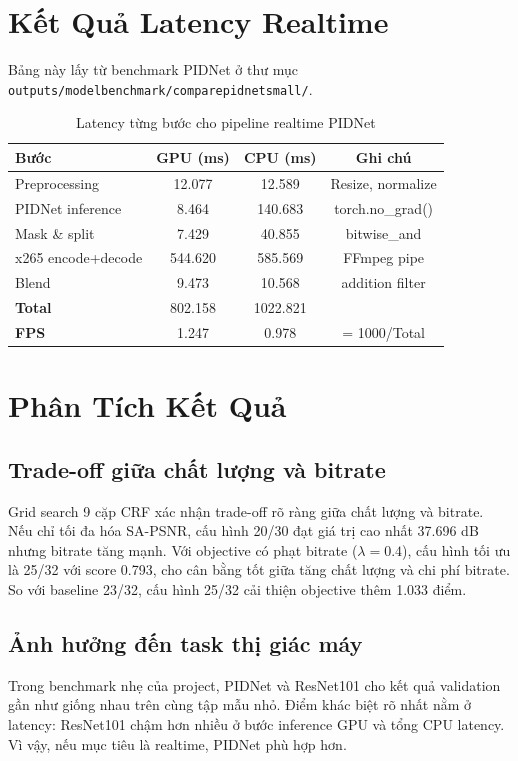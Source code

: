 \documentclass[12pt,a4paper]{article}
\begin{document}
\section{Kết Quả Latency Realtime}
Bảng này lấy từ benchmark PIDNet ở thư mục \texttt{outputs/model\textunderscore benchmark/compare\textunderscore pidnet\textunderscore small/}.

\begin{table}[H]
\centering
\caption{Latency từng bước cho pipeline realtime PIDNet}
\label{tab:latency}
\begin{tabular}{lccc}
\toprule
\textbf{Bước} & \textbf{GPU (ms)} & \textbf{CPU (ms)} & \textbf{Ghi chú} \\
\midrule
Preprocessing & 12.077 & 12.589 & Resize, normalize \\
PIDNet inference & 8.464 & 140.683 & torch.no\_grad() \\
Mask \& split & 7.429 & 40.855 & bitwise\_and \\
x265 encode+decode & 544.620 & 585.569 & FFmpeg pipe \\
Blend & 9.473 & 10.568 & addition filter \\
\midrule
\textbf{Total} & 802.158 & 1022.821 &  \\
\textbf{FPS} & 1.247 & 0.978 & = 1000/Total \\
\bottomrule
\end{tabular}
\end{table}

\section{Phân Tích Kết Quả}
\subsection{Trade-off giữa chất lượng và bitrate}
Grid search 9 cặp CRF xác nhận trade-off rõ ràng giữa chất lượng và bitrate. Nếu chỉ tối đa hóa SA-PSNR, cấu hình 20/30 đạt giá trị cao nhất 37.696 dB nhưng bitrate tăng mạnh. Với objective có phạt bitrate ($\lambda=0.4$), cấu hình tối ưu là 25/32 với score 0.793, cho cân bằng tốt giữa tăng chất lượng và chi phí bitrate. So với baseline 23/32, cấu hình 25/32 cải thiện objective thêm 1.033 điểm.

\subsection{Ảnh hưởng đến task thị giác máy}
Trong benchmark nhẹ của project, PIDNet và ResNet101 cho kết quả validation gần như giống nhau trên cùng tập mẫu nhỏ. Điểm khác biệt rõ nhất nằm ở latency: ResNet101 chậm hơn nhiều ở bước inference GPU và tổng CPU latency. Vì vậy, nếu mục tiêu là realtime, PIDNet phù hợp hơn.
\end{document}
